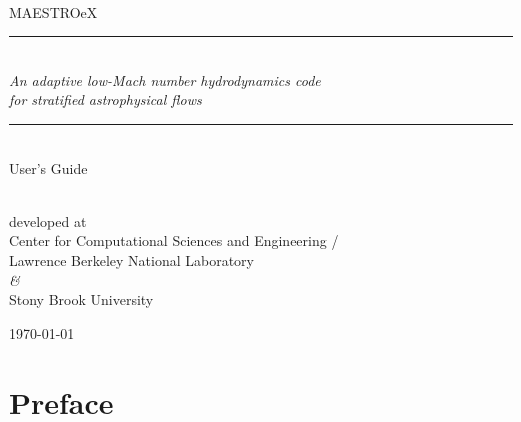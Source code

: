 \documentclass[11pt]{book}    %
\newcommand{\HRule}{\rule{\linewidth}{0.125mm}}
\renewcommand{\chaptermark}[1]{%
 \markboth{\chaptername
\ \thechapter.\ #1}{}}
\begin{document}
\frontmatter


\begin{titlepage}

\begin{center}

\ \\[2 in]
{\sf \Huge MAESTROeX} \\[0.25in]


\begin{minipage}{5.5in}
\HRule\\[2mm]
\centering
{\Large \em An adaptive low-Mach number hydrodynamics code\\ for stratified astrophysical flows}


\HRule
\end{minipage}

\ \\[1 in]
{\sf \huge User's Guide}

\ \\[1 in]
{developed at \\[5mm] Center for Computational Sciences and Engineering / \\ Lawrence Berkeley National Laboratory \\[3mm]
  {\em \&}  \\[3mm]
        Stony Brook University}

\vfill

{\large \today}

\end{center}

\end{titlepage}



\setcounter{tocdepth}{2}
\tableofcontents

\clearpage

\listoffigures
{}

\clearpage

\listoftables
{}


\clearpage

\chapter*{Preface}
\chaptermark{Preface}


\clearpage
\end{document}
